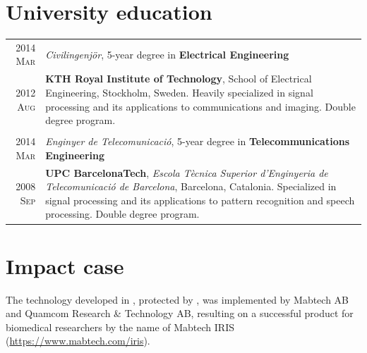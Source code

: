\documentclass[a4paper,10pt]{article}
\begin{document}

  \section{University education}

    \begin{tabular}{r|p{13cm}}	
    
      \textsc{2014 Mar}  & \emph{Civilingenj\"{o}r}, 5-year degree in \textbf{Electrical Engineering} \\
      \textsc{2012 Aug}  & \footnotesize{\textbf{KTH Royal Institute of Technology}, School of Electrical Engineering, Stockholm, Sweden. 
			   Heavily specialized in signal processing and its applications to communications and imaging. Double degree program.} \\ 
      \multicolumn{2}{c}{} \\

      
      \textsc{2014 Mar}  & \emph{Enginyer de Telecomunicaci\'{o}}, 5-year degree in \textbf{Telecommunications Engineering} \\  
      \textsc{2008 Sep}  & \footnotesize{\textbf{UPC BarcelonaTech}, \emph{Escola T\`{e}cnica Superior
			   d'Enginyeria de Telecomunicaci\'{o} de Barcelona}, Barcelona, Catalonia. 
			   Specialized in signal processing and its applications to pattern recognition and speech processing. Double degree program.} \\
    \end{tabular}

  \begin{bibunit}
    \renewcommand\refname{Publications}
    \nocite{AguilaPla2019b,AguilaPla2019a,AguilaPla2019,AguilaPla2017,AguilaPla2017a,AguilaPla2018,AguilaPla2018a,AguilaPla2014,Mabtech2017}
    \footnotesize{
    }

    \section{Impact case}
        
        The technology developed in \cite{AguilaPla2017,AguilaPla2017a}, protected by \cite{Mabtech2017},
        was implemented by Mabtech AB and Quamcom Research \& Technology AB, resulting on a successful product
        for biomedical researchers by the name of Mabtech IRIS (\url{https://www.mabtech.com/iris}).
    
  \end{bibunit}
  
\end{document}

